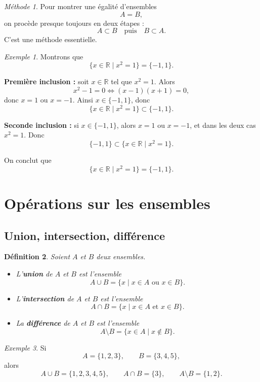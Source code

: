 \documentclass[11pt,a4paper]{article}
\newtheorem{definition}{Définition}[section]
\theoremstyle{remark}
\newtheorem{exemple}[definition]{Exemple}
\newtheorem*{methode}{Méthode}
\newcommand{\R}{\mathbb{R}}
\begin{document}
\begin{methode}
Pour montrer une égalité d’ensembles
\[
A=B,
\]
on procède presque toujours en deux étapes :
\[
A\subset B
\quad \text{puis} \quad
B\subset A.
\]
C’est une méthode essentielle.
\end{methode}

\begin{exemple}
Montrons que
\[
\{x\in\R \mid x^2=1\}=\{-1,1\}.
\]

\textbf{Première inclusion :} soit \(x\in\R\) tel que \(x^2=1\). Alors
\[
x^2-1=0 \Longleftrightarrow (x-1)(x+1)=0,
\]
donc \(x=1\) ou \(x=-1\). Ainsi \(x\in\{-1,1\}\), donc
\[
\{x\in\R \mid x^2=1\}\subset \{-1,1\}.
\]

\textbf{Seconde inclusion :} si \(x\in\{-1,1\}\), alors \(x=1\) ou \(x=-1\), et dans les deux cas \(x^2=1\). Donc
\[
\{-1,1\}\subset \{x\in\R \mid x^2=1\}.
\]

On conclut que
\[
\{x\in\R \mid x^2=1\}=\{-1,1\}.
\]
\end{exemple}

\section{Opérations sur les ensembles}

\subsection{Union, intersection, différence}

\begin{definition}
Soient \(A\) et \(B\) deux ensembles.
\begin{itemize}
    \item L’\textbf{union} de \(A\) et \(B\) est l’ensemble
    \[
    A\cup B=\{x \mid x\in A \text{ ou } x\in B\}.
    \]
    \item L’\textbf{intersection} de \(A\) et \(B\) est l’ensemble
    \[
    A\cap B=\{x \mid x\in A \text{ et } x\in B\}.
    \]
    \item La \textbf{différence} de \(A\) et \(B\) est l’ensemble
    \[
    A\setminus B=\{x\in A \mid x\notin B\}.
    \]
\end{itemize}
\end{definition}

\begin{exemple}
Si
\[
A=\{1,2,3\},
\qquad
B=\{3,4,5\},
\]
alors
\[
A\cup B=\{1,2,3,4,5\},
\qquad
A\cap B=\{3\},
\qquad
A\setminus B=\{1,2\}.
\]
\end{exemple}
\end{document}
